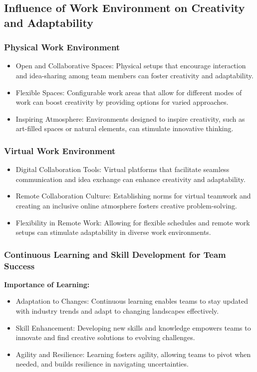 \documentclass[a4paper, twoside]{article}
\begin{document}
\subsection{Influence of Work Environment on Creativity and Adaptability}

\subsubsection{Physical Work Environment}

\begin{itemize}
    \item{Open and Collaborative Spaces:} Physical setups that encourage interaction and idea-sharing among team members can foster creativity and adaptability.
    \item{Flexible Spaces:} Configurable work areas that allow for different modes of work can boost creativity by providing options for varied approaches.
    \item{Inspiring Atmosphere:} Environments designed to inspire creativity, such as art-filled spaces or natural elements, can stimulate innovative thinking.
\end{itemize}

\subsubsection{Virtual Work Environment}

\begin{itemize}
    \item{Digital Collaboration Tools:} Virtual platforms that facilitate seamless communication and idea exchange can enhance creativity and adaptability.
    \item{Remote Collaboration Culture:} Establishing norms for virtual teamwork and creating an inclusive online atmosphere fosters creative problem-solving.
    \item{Flexibility in Remote Work:} Allowing for flexible schedules and remote work setups can stimulate adaptability in diverse work environments.
\end{itemize}

\subsubsection{Continuous Learning and Skill Development for Team Success}

\textbf{Importance of Learning:}
\begin{itemize}
    \item{Adaptation to Changes:} Continuous learning enables teams to stay updated with industry trends and adapt to changing landscapes effectively.
    \item{Skill Enhancement:} Developing new skills and knowledge empowers teams to innovate and find creative solutions to evolving challenges.
    \item{Agility and Resilience:} Learning fosters agility, allowing teams to pivot when needed, and builds resilience in navigating uncertainties.
\end{itemize}
\end{document}
